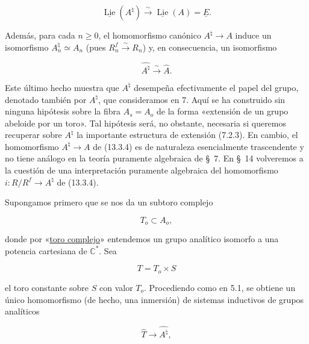 \begin{equation}\tag{13.3.5}
 \underline{\operatorname{Lie}}(A^\natural)
 \stackrel{\sim}{\longrightarrow}
 \underline{\operatorname{Lie}}(A)=\underline E.
\end{equation}

\noindent
Además, para cada $n\geqslant0$, el homomorfismo canónico
$A^\natural\longrightarrow A$ induce un isomorfismo
$A_n^\natural\simeq A_n$ (pues
$R_n^f\stackrel{\sim}{\longrightarrow}R_n$) y, en consecuencia, un
isomorfismo

\begin{equation}\tag{13.3.6}
 \widehat{A^\natural}\stackrel{\sim}{\longrightarrow}\widehat A.
\end{equation}

\noindent
Este último hecho muestra que $A^\natural$ desempeña efectivamente el
papel del grupo, denotado también por $A^\natural$, que consideramos en
7. Aquí se ha construido sin ninguna hipótesis sobre la fibra
$A_s=A_o$ de la forma «extensión de un grupo abeloide por un toro». Tal
hipótesis será, no obstante, necesaria si queremos recuperar sobre
$A^\natural$ la importante estructura de extensión (7.2.3). En cambio,
el homomorfismo $A^\natural\longrightarrow A$ de (13.3.4) es de
naturaleza esencialmente trascendente y no tiene análogo en la teoría
puramente algebraica de §~7. En §~14 volveremos a la cuestión de una
interpretación puramente algebraica del homomorfismo
$i:R/R^f\longrightarrow A^\natural$ de (13.3.4).


Supongamos primero que se nos da un subtoro complejo

\begin{equation}\tag{13.3.7}
 T_o\subset A_o,
\end{equation}

\noindent
donde por «\underline{toro complejo}» entendemos un grupo analítico
isomorfo a una potencia cartesiana de $\mathbb C^*$. Sea

\begin{equation}\tag{13.3.8}
 T=T_o\times S
\end{equation}

\noindent
el toro constante sobre $S$ con valor $T_o$. Procediendo como en 5.1,
se obtiene un único homomorfismo (de hecho, una inmersión) de sistemas
inductivos de grupos analíticos

\begin{equation*}
 \widehat T\longrightarrow\widehat{A^\natural},
\end{equation*}


